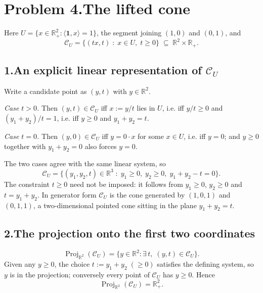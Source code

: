 \documentclass[11pt]{article}
\DeclareMathOperator{\Proj}{Proj}
\theoremstyle{definition}
\theoremstyle{plain}
\begin{document}
\section*{Problem 4.\quad The lifted cone \quad[20 pts]}

Here $U = \{x \in \mathbb{R}^2_+ : \langle \mathbf{1}, x \rangle = 1\}$,
the segment joining $(1,0)$ and $(0,1)$, and
\[
  \mathcal{C}_U = \{ (tx, t) \;:\; x \in U,\; t \ge 0 \}
  \;\subseteq\; \mathbb{R}^2 \times \mathbb{R}_+ .
\]

\subsection*{1.\quad An explicit linear representation of
  $\mathcal{C}_U$}

Write a candidate point as $(y, t)$ with $y \in \mathbb{R}^2$.

\emph{Case $t > 0$.} Then $(y,t) \in \mathcal{C}_U$ iff $x := y/t$ lies
in $U$, i.e. iff $y/t \ge 0$ and $(y_1 + y_2)/t = 1$, i.e. iff
$y \ge 0$ and $y_1 + y_2 = t$.

\emph{Case $t = 0$.} Then $(y,0) \in \mathcal{C}_U$ iff $y = 0 \cdot x$
for some $x \in U$, i.e. iff $y = 0$; and $y \ge 0$ together with
$y_1 + y_2 = 0$ also forces $y = 0$.

The two cases agree with the same linear system, so
\[
  \boxed{\;
  \mathcal{C}_U
  = \big\{ (y_1, y_2, t) \in \mathbb{R}^3 \;:\;
      y_1 \ge 0,\; y_2 \ge 0,\; y_1 + y_2 - t = 0 \big\}. \;}
\]
The constraint $t \ge 0$ need not be imposed: it follows from
$y_1 \ge 0$, $y_2 \ge 0$ and $t = y_1 + y_2$. In generator form
$\mathcal{C}_U$ is the cone generated by $(1,0,1)$ and $(0,1,1)$, a
two-dimensional pointed cone sitting in the plane $y_1 + y_2 = t$.

\subsection*{2.\quad The projection onto the first two coordinates}

\[
  \Proj_{\mathbb{R}^2}(\mathcal{C}_U)
  = \{ y \in \mathbb{R}^2 : \exists\, t,\; (y,t) \in \mathcal{C}_U \}.
\]
Given any $y \ge 0$, the choice $t := y_1 + y_2 \;(\ge 0)$ satisfies the
defining system, so $y$ is in the projection; conversely every point of
$\mathcal{C}_U$ has $y \ge 0$. Hence
\[
  \boxed{\;\Proj_{\mathbb{R}^2}(\mathcal{C}_U) = \mathbb{R}^2_+ .\;}
\]
\end{document}
